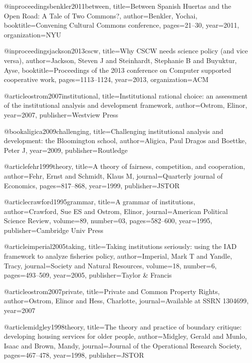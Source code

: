 @inproceedings{benkler2011between,
  title={Between Spanish Huertas and the Open Road: A Tale of Two Commons?},
  author={Benkler, Yochai},
  booktitle={Convening Cultural Commons conference},
  pages={21--30},
  year={2011},
  organization={NYU}
}

@inproceedings{jackson2013cscw,
  title={Why CSCW needs science policy (and vice versa)},
  author={Jackson, Steven J and Steinhardt, Stephanie B and Buyuktur, Ayse},
  booktitle={Proceedings of the 2013 conference on Computer supported cooperative work},
  pages={1113--1124},
  year={2013},
  organization={ACM}
}

@article{ostrom2007institutional,
  title={Institutional rational choice: an assessment of the institutional analysis and development framework},
  author={Ostrom, Elinor},
  year={2007},
  publisher={Westview Press}
}

@book{aligica2009challenging,
  title={Challenging institutional analysis and development: the Bloomington school},
  author={Aligica, Paul Dragos and Boettke, Peter J},
  year={2009},
  publisher={Routledge}
}

@article{fehr1999theory,
  title={A theory of fairness, competition, and cooperation},
  author={Fehr, Ernst and Schmidt, Klaus M},
  journal={Quarterly journal of Economics},
  pages={817--868},
  year={1999},
  publisher={JSTOR}
}


@article{crawford1995grammar,
  title={A grammar of institutions},
  author={Crawford, Sue ES and Ostrom, Elinor},
  journal={American Political Science Review},
  volume={89},
  number={03},
  pages={582--600},
  year={1995},
  publisher={Cambridge Univ Press}
}

@article{imperial2005taking,
  title={Taking institutions seriously: using the IAD framework to analyze fisheries policy},
  author={Imperial, Mark T and Yandle, Tracy},
  journal={Society and Natural Resources},
  volume={18},
  number={6},
  pages={493--509},
  year={2005},
  publisher={Taylor \& Francis}
}

@article{ostrom2007private,
  title={Private and Common Property Rights},
  author={Ostrom, Elinor and Hess, Charlotte},
  journal={Available at SSRN 1304699},
  year={2007}
}

@article{midgley1998theory,
  title={The theory and practice of boundary critique: developing housing services for older people},
  author={Midgley, Gerald and Munlo, Isaac and Brown, Mandy},
  journal={Journal of the Operational Research Society},
  pages={467--478},
  year={1998},
  publisher={JSTOR}
}

